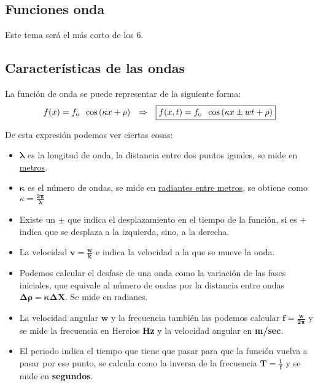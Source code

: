 \subsection{Funciones onda}
 Este tema será el más corto de los 6.
\subsection{Características de las ondas}
 La función de onda se puede representar de la siguiente forma:
\[
        f(x) = f_{\textnormal{o}}\hspace{2mm} \cos{(\kappa x + \rho)} \hspace{2.5mm}\Rightarrow  \hspace{2.5mm}\boxed{f(x,t) = f_{\textnormal{o}}\hspace{2mm}\cos{(\kappa x \pm  wt+\rho)}}
\]
\begin{adjustwidth}{0em}{-8em}
\end{adjustwidth}
 \hspace{-5em} De esta expresión podemos ver ciertas cosas:
\begin{itemize}
        \item \(\mathbf{\lambda}\) es la longitud de onda, la distancia entre dos puntos iguales, se mide en \underline{metros}.
        \item \(\mathbf{\kappa}\) es el número de ondas, se mide en \underline{radiantes entre metros}, se obtiene como \(\boxed{\kappa=\mathbf{\frac{2\pi}{\lambda}}}\)
        \item Existe un \(\mathbf{\pm}\) que indica el desplazamiento en el tiempo de la función, si es \(\mathbf{+}\) indica que se desplaza a la izquierda, sino, a la derecha.
        \item La velocidad \(\boxed{\mathbf{v = \frac{w}{k}}}\) e indica la velocidad a la que se mueve la onda.
        \item Podemos calcular el desfase de una onda como la variación de las fases iniciales, que equivale al número de ondas por la distancia entre ondas \(\boxed{\mathbf{\Delta \rho = \kappa \Delta X}}\). Se mide en radianes.
        \item La velocidad angular \(\mathbf{w}\) y la frecuencia también las podemos calcular \(\boxed{\mathbf{f = \frac{w}{2\pi}}}\) y se mide la frecuencia en Hercios \textbf{Hz} y la velocidad angular en \textbf{m/sec}.
        \item El periodo indica el tiempo que tiene que pasar para que la función vuelva a pasar por ese punto, se calcula como la inversa de la frecuencia \(\boxed{\mathbf{T = \frac{1}{f}}}\) y se mide en \textbf{segundos}.
\end{itemize}
